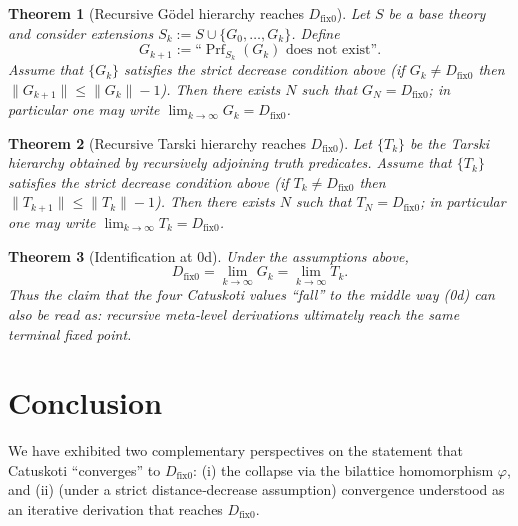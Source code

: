 \documentclass[12pt,a4paper]{article}
\newcommand{\dfix}{D_{\mathrm{fix}0}} %
\newcommand{\phiMap}{\varphi}            %
\newtheorem{theorem}{Theorem}[section]
\begin{document}
\begin{theorem}[Recursive G\"odel hierarchy reaches $\dfix$]
Let $S$ be a base theory and consider extensions $S_k:=S\cup\{G_0,\dots,G_k\}$.
Define
\[
  G_{k+1}:=\text{``}\operatorname{Prf}_{S_k}(G_k)\text{ does not exist''}.
\]
Assume that $\{G_k\}$ satisfies the strict decrease condition above (if $G_k\neq\dfix$ then $\|G_{k+1}\|\le \|G_k\|-1$).
Then there exists $N$ such that $G_N=\dfix$; in particular one may write $\lim_{k\to\infty}G_k=\dfix$.
\end{theorem}

\begin{theorem}[Recursive Tarski hierarchy reaches $\dfix$]
Let $\{T_k\}$ be the Tarski hierarchy obtained by recursively adjoining truth predicates.
Assume that $\{T_k\}$ satisfies the strict decrease condition above (if $T_k\neq\dfix$ then $\|T_{k+1}\|\le \|T_k\|-1$).
Then there exists $N$ such that $T_N=\dfix$; in particular one may write $\lim_{k\to\infty}T_k=\dfix$.
\end{theorem}

\begin{theorem}[Identification at $0$d]
Under the assumptions above,
\[
\dfix
= \lim_{k \to \infty} G_k
= \lim_{k \to \infty} T_k.
\]
Thus the claim that the four Catuskoti values ``fall'' to the middle way (0d) can also be read as:
recursive meta‑level derivations ultimately reach the same terminal fixed point.
\end{theorem}

\section{Conclusion}

We have exhibited two complementary perspectives on the statement that Catuskoti ``converges'' to $\dfix$:
(i) the collapse via the bilattice homomorphism $\phiMap$, and
(ii) (under a strict distance‑decrease assumption) convergence understood as an iterative derivation that reaches $\dfix$.
\end{document}
